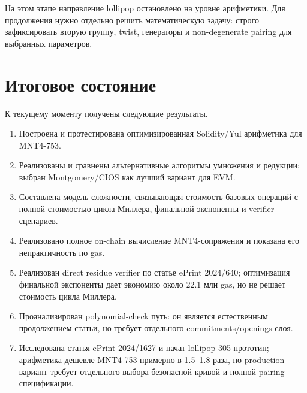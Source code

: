 \documentclass[12pt,a4paper]{article}
\begin{document}
На этом этапе направление lollipop остановлено на уровне арифметики. Для продолжения нужно отдельно решить математическую задачу: строго зафиксировать вторую группу, twist, генераторы и non-degenerate pairing для выбранных параметров.

\section{Итоговое состояние}

К текущему моменту получены следующие результаты.

\begin{enumerate}
    \item Построена и протестирована оптимизированная Solidity/Yul арифметика для MNT4-753.
    \item Реализованы и сравнены альтернативные алгоритмы умножения и редукции; выбран Montgomery/CIOS как лучший вариант для EVM.
    \item Составлена модель сложности, связывающая стоимость базовых операций с полной стоимостью цикла Миллера, финальной экспоненты и verifier-сценариев.
    \item Реализовано полное on-chain вычисление MNT4-сопряжения и показана его непрактичность по gas.
    \item Реализован direct residue verifier по статье ePrint 2024/640; оптимизация финальной экспоненты дает экономию около 22.1 млн gas, но не решает стоимость цикла Миллера.
    \item Проанализирован polynomial-check путь: он является естественным продолжением статьи, но требует отдельного commitments/openings слоя.
    \item Исследована статья ePrint 2024/1627 и начат lollipop-305 прототип; арифметика дешевле MNT4-753 примерно в 1.5--1.8 раза, но production-вариант требует отдельного выбора безопасной кривой и полной pairing-спецификации.
\end{enumerate}
\end{document}
